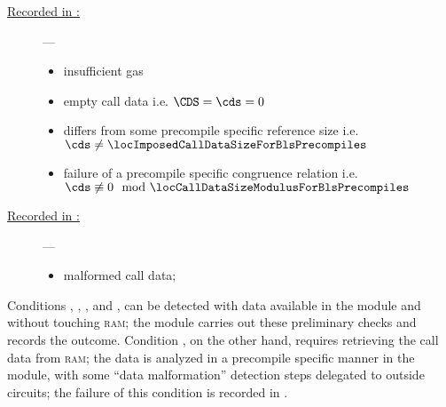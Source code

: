 \begin{description}
	\item[\underline{Recorded in \scenPrcFailureKnownToHub{}:}] ---
		\begin{itemize}
			\item
				\locBlsPrecompileFailureReasonGas{}
				insufficient gas
			\item
				\locBlsPrecompileFailureReasonEmpty{}
				empty call data i.e. $\CDS =\cds = 0$
			\item
				\locBlsPrecompileFailureReasonSize{}
				\cds{} differs from some precompile specific reference size i.e. $\cds \neq \locImposedCallDataSizeForBlsPrecompiles$
			\item
				\locBlsPrecompileFailureReasonMod{}
				failure of a precompile specific congruence relation i.e. $\cds \not \equiv 0 \mod \locCallDataSizeModulusForBlsPrecompiles$
		\end{itemize}
	\item[\underline{Recorded in \scenPrcFailureKnownToRam{}:}] ---
		\begin{itemize}
			\item
				\locBlsPrecompileFailureReasonData{}
				malformed call data;
		\end{itemize}
\end{description}
Conditions
\locBlsPrecompileFailureReasonGas,
\locBlsPrecompileFailureReasonEmpty,
\locBlsPrecompileFailureReasonSize, and
\locBlsPrecompileFailureReasonMod,
can be detected with data available in the \hubMod{} module and without touching \textsc{ram};
the \oobMod{} module carries out these preliminary checks and \scenPrcFailureKnownToHub{} records the outcome.
Condition
\locBlsPrecompileFailureReasonData,
on the other hand,
requires retrieving the call data from \textsc{ram};
the data is analyzed in a precompile specific manner in the \blsMod{} module,
with some ``data malformation'' detection steps delegated to outside circuits;
the failure of this condition is recorded in \scenPrcFailureKnownToRam{}.

